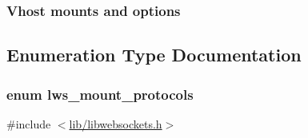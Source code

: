 \subsubsection*{Vhost mounts and options}

\subsection{Enumeration Type Documentation}
\subsubsection[{\texorpdfstring{lws\+\_\+mount\+\_\+protocols}{lws\_mount\_protocols}}]{\setlength{\rightskip}{0pt plus 5cm}enum {\bf lws\+\_\+mount\+\_\+protocols}}\hypertarget{group__vhost-mounts_ga31eca18e50cb4357480f2fcad36ff437}{}\label{group__vhost-mounts_ga31eca18e50cb4357480f2fcad36ff437}


{\ttfamily \#include $<$\hyperlink{libwebsockets_8h}{lib/libwebsockets.\+h}$>$}


